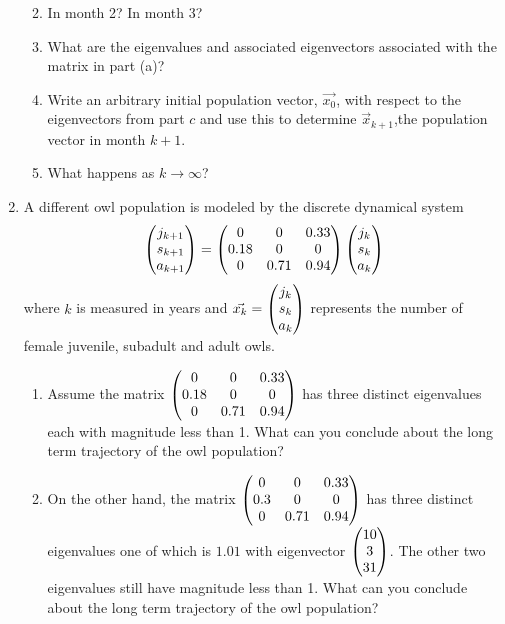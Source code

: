 \documentclass[11pt,fleqn]{article}
\begin{document}
\begin{enumerate}
\begin{enumerate}
 \vfill
 \newpage
 \item In month 2? In month 3?
 \vspace{1in}
 \item What are the eigenvalues and associated eigenvectors associated with the matrix in part (a)?
 \vspace{1.5in}
 \item Write an arbitrary initial population vector, $\vec{x_0}$, with respect to the eigenvectors from part $c$ and use this to determine $\vec{x}_{k+1}$,the population vector in month $k+1.$
 \vfill
 \item What happens as $k \to \infty$?
 \vfill
 \end{enumerate}
 \newpage
 \item A different owl population is modeled by the discrete dynamical system $$\begin{pmatrix} j_{k+1}\\s_{k+1}\\a_{k+1} \end{pmatrix} = \begin{pmatrix} 0&0&0.33\\ 0.18&0&0\\0&0.71&0.94\end{pmatrix} \begin{pmatrix} j_{k}\\s_{k}\\a_{k}\end{pmatrix}$$ where $k$ is measured in years and $\vec{x_k}=\begin{pmatrix} j_{k}\\s_{k}\\a_{k}\end{pmatrix}$ represents the number of female juvenile, subadult and adult owls. 
 \begin{enumerate}
 \item Assume the matrix $ \begin{pmatrix} 0&0&0.33\\ 0.18&0&0\\0&0.71&0.94\end{pmatrix} $ has three distinct eigenvalues each with magnitude less than 1. What can you conclude about the long term trajectory of the owl population?
 \vfill
 \item On the other hand, the matrix $ \begin{pmatrix} 0&0&0.33\\ 0.3&0&0\\0&0.71&0.94\end{pmatrix} $ has three distinct eigenvalues one of which is $1.01$ with eigenvector $\begin{pmatrix} 10\\3\\31 \end{pmatrix}$. The other two eigenvalues still have magnitude less than 1. What can you conclude about the long term trajectory of the owl population?
\vfill
\end{enumerate}
   \end{enumerate}
  
\end{document}
